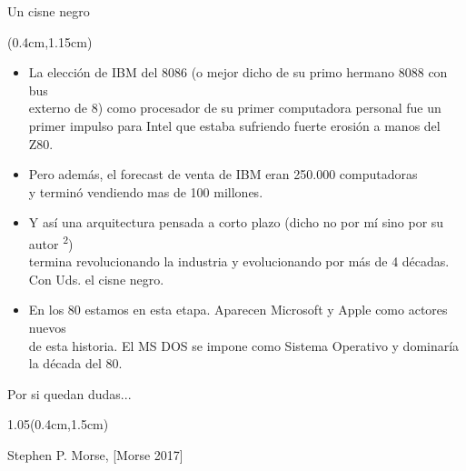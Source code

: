 \documentclass[table,dvipsnames,aspectratio=169]{beamer}
\begin{document}
\begin{frame}{Un cisne negro}
 \begin{textblock*}{\textwidth}(0.4cm,1.15cm)
  \begin{itemize} [<+(1)->] \justifying
   \item La elección de IBM del 8086 {\small (o mejor dicho de su primo hermano 8088 con bus\\
   externo de \SI{8}{\bit})} como procesador de su primer computadora personal \textcolor{furfiBlue}{fue un\\
   primer impulso para Intel} que estaba sufriendo fuerte erosión a manos del Z80.
   \item Pero además, el forecast de venta de IBM eran 250.000 computadoras\\
   \textcolor{furfiBlue}{y terminó vendiendo mas de 100 millones}.
   \item Y así una arquitectura pensada a \textcolor{furfiBlue}{corto plazo} {\small (dicho no por mí sino por su autor \textsuperscript{2})}\\
   termina revolucionando la industria y evolucionando por más de 4 décadas.\\
   \textcolor{furfiBlue}{Con Uds. el cisne negro.}
   \item En los 80 estamos en esta etapa. Aparecen Microsoft y Apple como actores nuevos\\
   de esta historia. \textcolor{furfiBlue}{El MS DOS se impone como Sistema Operativo y dominaría\\ la década del 80.}
  \end{itemize}
 \end{textblock*}
\end{frame}

\begin{frame}{Por si quedan dudas...}
 \begin{textblock*}{1.05\textwidth}(0.4cm,1.5cm)

Stephen P. Morse, [Morse 2017]

 \end{textblock*}
\end{frame}
\end{document}
